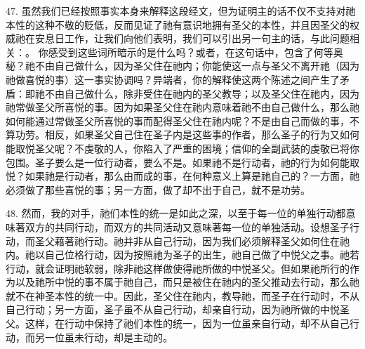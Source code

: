 47. 虽然我们已经按照事实本身来解释这段经文，但为证明主的话不仅不支持对祂本性的这种不敬的贬低，反而见证了祂有意识地拥有圣父的本性，并且因圣父的权威祂在安息日工作，让我们向他们表明，我们可以引出另一句主的话，与此问题相关：。 你感受到这些词所暗示的是什么吗？或者，在这句话中，包含了何等奥秘？祂不由自己做什么，因为圣父住在祂内；你能使这一点与圣父不离开祂（因为祂做喜悦的事）这一事实协调吗？异端者，你的解释使这两个陈述之间产生了矛盾：即祂不由自己做什么，除非受住在祂内的圣父教导；以及圣父住在祂内，因为祂常做圣父所喜悦的事。因为如果圣父住在祂内意味着祂不由自己做什么，那么祂如何能通过常做圣父所喜悦的事而配得圣父住在祂内呢？不是由自己而做的事，不算功劳。相反，如果圣父自己住在圣子内是这些事的作者，那么圣子的行为又如何能取悦圣父呢？不虔敬的人，你陷入了严重的困境；信仰的全副武装的虔敬已将你包围。圣子要么是一位行动者，要么不是。如果祂不是行动者，祂的行为如何能取悦？如果祂是行动者，那么由而成的事，在何种意义上算是祂自己的？一方面，祂必须做了那些喜悦的事；另一方面，做了却不出于自己，就不是功劳。\par

48. 然而，我的对手，祂们本性的统一是如此之深，以至于每一位的单独行动都意味著双方的共同行动，而双方的共同活动又意味著每一位的单独活动。设想圣子行动，而圣父藉著祂行动。祂并非从自己行动，因为我们必须解释圣父如何住在祂内。祂以自己位格行动，因为按照祂为圣子的出生，祂自己做了中悦父之事。祂若行动，就会证明祂软弱，除非祂这样做使得祂所做的中悦圣父。但如果祂所行的作为以及祂所中悦的事不属于祂自己，而只是被住在祂内的圣父推动去行动，那么祂就不在神圣本性的统一中。因此，圣父住在祂内，教导祂，而圣子在行动时，不从自己行动；另一方面，圣子虽不从自己行动，却亲自行动，因为祂所做的中悦圣父。这样，在行动中保持了祂们本性的统一，因为一位虽亲自行动，却不从自己行动，而另一位虽未行动，却是主动的。\par

